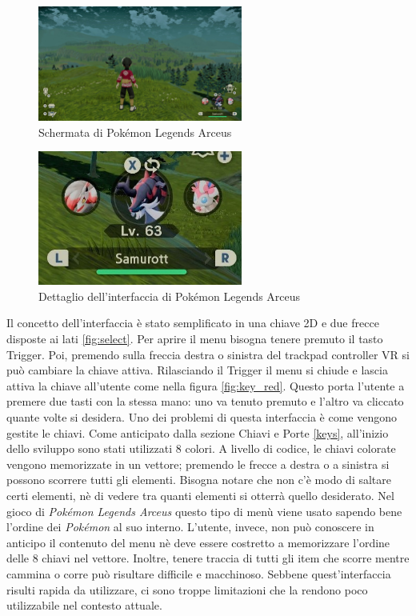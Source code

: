 \documentclass[target=bach,aauheader=]{thud}
\begin{document}
\begin{figure}[h]
    \centering
    \includegraphics[width=0.60\textwidth]{pok1}
    \caption{Schermata di Pokémon Legends Arceus}
    \label{fig:pok1}
\end{figure}

\begin{figure}[h]
    \centering
    \includegraphics[width=0.60\textwidth]{pok2}
    \caption{Dettaglio dell'interfaccia di Pokémon Legends Arceus}
    \label{fig:pok2}
\end{figure}

Il concetto dell'interfaccia è stato semplificato in una chiave 2D e due frecce disposte ai lati \ref{fig:select}.
Per aprire il menu bisogna tenere premuto il tasto Trigger.
Poi, premendo sulla freccia destra o sinistra del trackpad controller VR si può cambiare la chiave attiva.
Rilasciando il Trigger il menu si chiude e lascia attiva la chiave all'utente come nella figura \ref{fig:key_red}.
Questo porta l'utente a premere due tasti con la stessa mano: uno va tenuto premuto e l'altro va cliccato quante volte si desidera.
Uno dei problemi di questa interfaccia è come vengono gestite le chiavi.
Come anticipato dalla sezione Chiavi e Porte \ref{keys}, all'inizio dello sviluppo sono stati utilizzati 8 colori.
A livello di codice, le chiavi colorate vengono memorizzate in un vettore; premendo le frecce a destra o a sinistra si possono scorrere tutti gli elementi.
Bisogna notare che non c'è modo di saltare certi elementi, nè di vedere tra quanti elementi si otterrà quello desiderato.
Nel gioco di \textit{Pokémon Legends Arceus} questo tipo di menù viene usato sapendo bene l'ordine dei \textit{Pokémon} al suo interno.
L'utente, invece, non può conoscere in anticipo il contenuto del menu nè deve essere costretto a memorizzare l'ordine delle 8 chiavi nel vettore.
Inoltre, tenere traccia di tutti gli item che scorre mentre cammina o corre può risultare difficile e macchinoso.
Sebbene quest'interfaccia risulti rapida da utilizzare, ci sono troppe limitazioni che la rendono poco utilizzabile nel contesto attuale.
\end{document}
